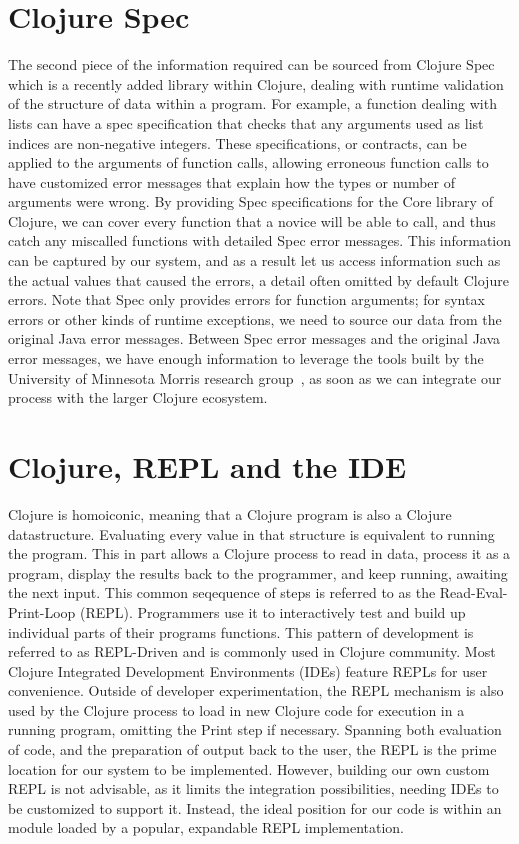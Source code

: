 \documentclass[12pt]{article}
\begin{document}
\section{Clojure Spec}
The second piece of the information required can be sourced from Clojure Spec~\cite{spec}
which is a recently added library within Clojure, dealing with runtime validation of
the structure of data within a program. For example, a function dealing with
lists can have a spec specification that checks that any arguments used as list indices
are non-negative integers.
These specifications, or contracts, can be applied to
 the arguments of function calls, allowing erroneous function calls to have
customized error messages that explain how the types or number of arguments were wrong.
By providing Spec specifications for the Core library of Clojure,
 we can cover every function that a novice will be able to call, and thus catch
 any miscalled functions with detailed Spec error messages.
 This information can be captured by our system, and as a result
 let us access information such as the actual values that caused the errors,
 a detail often omitted by default Clojure errors.
Note that Spec only provides errors for function arguments; for syntax errors or other kinds of
runtime exceptions, we need to source our data from the original Java error messages.
Between Spec error messages and the original Java error messages, we have enough
information to leverage the tools built by the
 University of Minnesota Morris research group~\cite{mics2017}, as soon as we can integrate
 our process with the larger Clojure ecosystem.

\section{Clojure, REPL and the IDE}
Clojure is homoiconic, meaning that a Clojure program is also a Clojure datastructure.
 Evaluating every value in that structure is
equivalent to running the program.
This in part allows a Clojure process to read in data, process it as a program, display the results
 back to the programmer, and keep running, awaiting the next input.
 This common seqequence of steps is referred to
as the Read-Eval-Print-Loop (REPL). Programmers use it to interactively test and build up
individual parts of their programs functions. This pattern of development is
referred to as REPL-Driven and is commonly used in Clojure community.
 Most Clojure Integrated Development Environments (IDEs) feature REPLs for
 user convenience. Outside of developer experimentation, the REPL mechanism is also used
by the Clojure process to load in new Clojure code for execution in a running program,
omitting the Print step if necessary.
Spanning both evaluation of code, and the preparation of output back to the user,
the REPL is the prime location for our system to be implemented.
However, building our own custom REPL is not advisable, as it limits the
integration possibilities, needing IDEs to be customized to support it.
Instead, the ideal position for our code is within an module loaded
by a popular, expandable REPL implementation.
\end{document}
